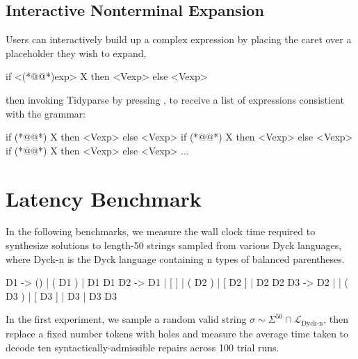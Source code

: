 \documentclass[sigplan,nonacm]{acmart}\settopmatter{printfolios=false,printccs=false,printacmref=false}
\begin{document}
\subsection{Interactive Nonterminal Expansion}

Users can interactively build up a complex expression by placing the caret over a placeholder they wish to expand,

\begin{tidyinput}
if <(*@@*)exp> X then <Vexp> else <Vexp>
\end{tidyinput}

\noindent then invoking Tidyparse by pressing \keys{\ctrl + \SPACE}, to receive a list of expressions consistient with the grammar:

\begin{tidyoutput}
if (*@@*) X then <Vexp> else <Vexp>
if (*@@*) X then <Vexp> else <Vexp>
if (*@@*) X then <Vexp> else <Vexp>
...
\end{tidyoutput}

%

\section{Latency Benchmark}

In the following benchmarks, we measure the wall clock time required to synthesize solutions to length-50 strings sampled from various Dyck languages, where Dyck-n is the Dyck language containing n types of balanced parentheses.

\begin{tidyinput}
D1 -> () | ( D1 ) | D1 D1
D2 -> D1 | [ ] | ( D2 ) | [ D2 ] | D2 D2
D3 -> D2 | { } | ( D3 ) | [ D3 ] | { D3 } | D3 D3
\end{tidyinput}

\noindent In the first experiment, we sample a random valid string $\sigma \sim \Sigma^{50} \cap \mathcal{L}_{\text{Dyck-n}}$, then replace a fixed number tokens with holes and measure the average time taken to decode ten syntactically-admissible repairs across 100 trial runs.
\end{document}
